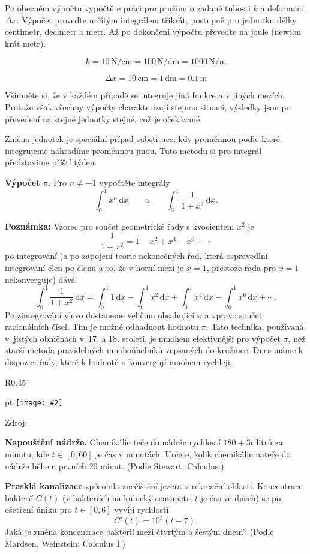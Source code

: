 \documentclass{article}
\def\zlomek{0.45}
\def\nic{}
\newcommand\obrazek[2][pixabay.com]{
  \clearpage
  \def\test{#1}
\begin{wrapfigure}{R}{\zlomek\linewidth}
  \begin{minipage}{1.0\linewidth}\parskip 0 pt
  \texttt{[image: \#2]}

  \vspace*{-10pt}
  \ifx\test\nic\else
  \null\hfill{\color{gray}\footnotesize Zdroj: #1}
  \fi

  \mezera
  \end{minipage}
\end{wrapfigure}
}
\let\oldtextbf\textbf
\def\textbf#1{%
  \oldtextbf{\color{red} #1}}
\def\mezera{\vspace*{10pt}}
\begin{document}
Po obecném výpočtu vypočtěte práci pro pružinu o zadané tuhosti $k$ a
deformaci $\Delta x$. Výpočet proveďte určitým integrálem třikrát,
postupně pro jednotku délky centimetr, decimetr a metr. Až po
dokončení výpočtu převeďte na joule (newton krát metr).

$$k=10 \,\mathrm{N}/\mathrm{cm}=100 \,\mathrm{N}/\mathrm{dm}=1000 \,\mathrm{N}/\mathrm{m}$$

$$\Delta x=10\,\mathrm{cm}=1\,\mathrm{dm}=0.1\,\mathrm{m}$$

Všimněte si, že v každém případě se integruje jiná funkce a v jiných
mezích. Protože však všechny výpočty charakterizují stejnou situaci,
výsledky jsou po převedení na stejné jednotky stejné, což je
očekávané.

Změna jednotek je speciální případ substituce, kdy proměnnou podle
které integrujeme nahradíme proměnnou jinou. Tuto metodu si pro
integrál představíme příští týden.


\newpage

\textbf{Výpočet $\pi$.}  Pro $n\neq -1$ vypočtěte integrály
$$\int_0^1 x^n\,\mathrm dx \qquad \text{a} \qquad \int_0^1
\frac{1}{1+x^2}\,\mathrm dx.$$

\textbf{Poznámka:} Vzorec pro součet geometrické
řady s kvocientem $x^2$ je $$\frac{1}{1+x^2}=1-x^2+x^4-x^6+\cdots$$ po integrování (a po
zapojení teorie nekonečných řad, která ospravedlní integrování člen po
členu a to, že v horní mezi je $x=1$, přestože řada pro $x=1$ nekonverguje) dává
$$
\int_0^1 \frac{1}{1+x^2}\,\mathrm dx
=
\int_0^1 1\,\mathrm dx
-
\int_0^1 x^2\,\mathrm dx
+
\int_0^1 x^4\,\mathrm dx
-
\int_0^1 x^6\,\mathrm dx
+\cdots .
$$
Po zintegrování vlevo dostaneme veličinu obsahující $\pi$ a vpravo
součet racionálních čísel. Tím je možné odhadnout hodnotu $\pi$. Tato
technika, používaná v~jistých obměnách v~17. a 18. století, je mnohem
efektivnější pro výpočet $\pi$, než starší metoda pravidelných
mnohoúhelníků vepsaných do kružnice. Dnes máme k dispozici řady,
které k hodnotě $\pi$ konvergují mnohem rychleji.

\newpage

\obrazek[]{slovnik.jpg}

\textbf{Napouštění nádrže.} Chemikálie teče do nádrže rychlostí
$180+3t$ litrů za minutu, kde $t\in [0,60]$ je čas v minutách. Určete, kolik chemikálie
nateče do nádrže během prvních 20 minut. (Podle Stewart: Calculus.)

\textbf{Prasklá kanalizace }způsobila znečištění jezera v rekreační
oblasti. Koncentrace bakterií $C(t)$ (v bakteriích na kubický
centimetr, $t$ je čas ve dnech) se po ošetření úniku pro $t\in[0,6]$  vyvíjí
rychlostí $$C'(t)=10^3(t-7).$$ Jaká je změna koncentrace bakterií mezi
čtvrtým a šestým dnem? (Podle Mardsen, Weinstein: Calculus I.)
\end{document}
